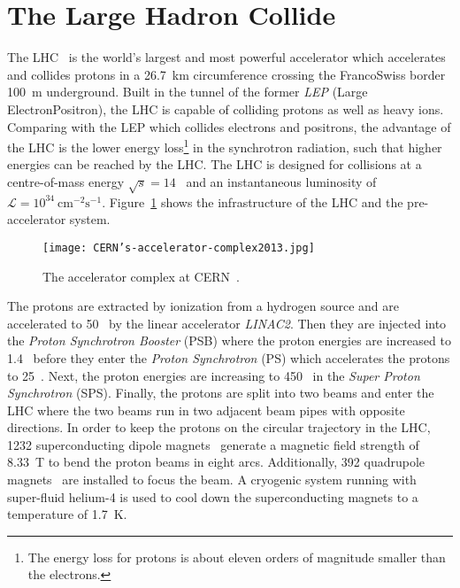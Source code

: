 
\section{The Large Hadron Collide}
\label{sec:ae_LHC}
The LHC~\cite{Evans:2008zzb} is the world's largest and most powerful accelerator which accelerates and collides protons in a 26.7~km circumference crossing the Franco\textendash Swiss border 100~m underground.
Built in the tunnel of the former \textit{LEP} (Large Electron\textendash Positron), the LHC is capable of colliding protons as well as heavy ions.
Comparing with the LEP which collides electrons and positrons, the advantage of the LHC is the lower energy loss\footnote{The energy loss for protons is about eleven orders of magnitude smaller than the electrons.} in the synchrotron radiation, such that higher energies can be reached by the LHC.
The LHC is designed for collisions at a centre-of-mass energy $\sqrt{s}=14$~{\TeV} and an instantaneous luminosity of $\mathcal{L} =10^{34}~\textrm{cm}^{-2}\textrm{s}^{-1}$.
Figure~\ref{fig:ae_CERN_accelerator_complex} shows the infrastructure of the LHC and the pre-accelerator system.

\begin{figure}[htbp]
    \begin{center}
        \texttt{[image: CERN's-accelerator-complex2013.jpg]}
        \caption{The accelerator complex at CERN~\cite{Marcastel:1621583}.}
        \label{fig:ae_CERN_accelerator_complex}
    \end{center}
\end{figure}

The protons are extracted by ionization from a hydrogen source and are accelerated to 50~{\MeV} by the linear accelerator \textit{LINAC2}.
Then they are injected into the \textit{Proton Synchrotron Booster} (PSB) where the proton energies are increased to 1.4~{\GeV} before they enter the \textit{Proton Synchrotron} (PS) which accelerates the protons to 25~{\GeV}.
Next, the proton energies are increasing to 450~{\GeV} in the \textit{Super Proton Synchrotron} (SPS). 
Finally, the protons are split into two beams and enter the LHC where the two beams run in two adjacent beam pipes with opposite directions.
In order to keep the protons on the circular trajectory in the LHC, 1232 superconducting dipole magnets~\cite{Rossi:2003np} generate a magnetic field strength of 8.33~T to bend the proton beams in eight arcs.
Additionally, 392 quadrupole magnets~\cite{Rossi:2003np} are installed to focus the beam.
A cryogenic system running with super-fluid helium-4 is used to cool down the superconducting magnets to a temperature of 1.7~K.

